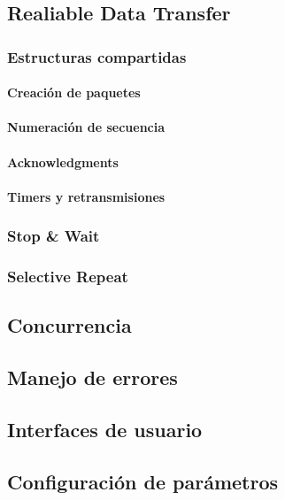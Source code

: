 \subsection{Realiable Data Transfer}
\subsubsection{Estructuras compartidas}
\paragraph{Creación de paquetes}
\paragraph{Numeración de secuencia}
\paragraph{Acknowledgments}
\paragraph{Timers y retransmisiones}
\subsubsection{Stop \& Wait}
\subsubsection{Selective Repeat}
\subsection{Concurrencia}
\subsection{Manejo de errores}
\subsection{Interfaces de usuario}
\subsection{Configuración de parámetros}